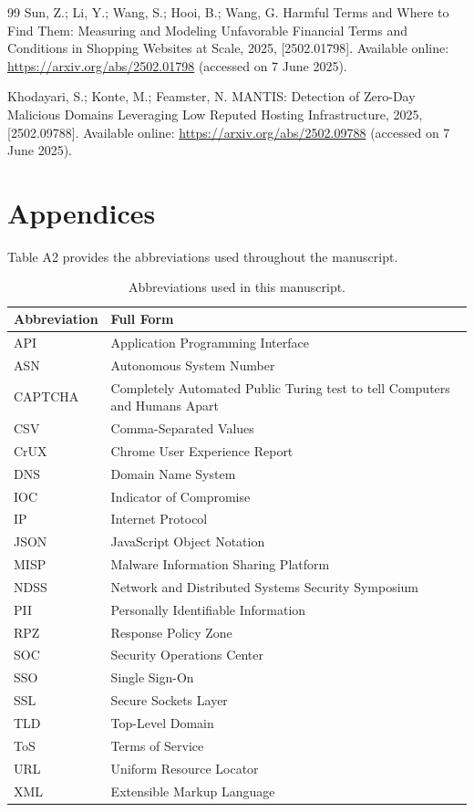 \documentclass[journal,article,submit,pdftex,moreauthors]{Definitions/mdpi}
\begin{document}
\begin{thebibliography}{99}
Sun, Z.; Li, Y.; Wang, S.; Hooi, B.; Wang, G. Harmful Terms and Where to Find Them: Measuring and Modeling Unfavorable Financial Terms and Conditions in Shopping Websites at Scale, 2025, [2502.01798]. Available online: \url{https://arxiv.org/abs/2502.01798} (accessed on 7 June 2025).

Khodayari, S.; Konte, M.; Feamster, N. MANTIS: Detection of Zero-Day Malicious Domains Leveraging Low Reputed Hosting Infrastructure, 2025, [2502.09788]. Available online: \url{https://arxiv.org/abs/2502.09788} (accessed on 7 June 2025).

\end{thebibliography}

\appendixstart
\appendix

\section[Appendix~\thesection]{Appendices}

Table A2 provides the abbreviations used throughout the manuscript.

\begin{table}[H]
\caption{Abbreviations used in this manuscript.\label{tab:A2}}
\begin{tabularx}{\textwidth}{lX}
\toprule
\textbf{Abbreviation} & \textbf{Full Form}\\
\midrule
API & Application Programming Interface\\
ASN & Autonomous System Number\\
CAPTCHA & Completely Automated Public Turing test to tell Computers and Humans Apart\\
CSV & Comma-Separated Values\\
CrUX & Chrome User Experience Report\\
DNS & Domain Name System\\
IOC & Indicator of Compromise\\
IP & Internet Protocol\\
JSON & JavaScript Object Notation\\
MISP & Malware Information Sharing Platform\\
NDSS & Network and Distributed Systems Security Symposium\\
PII & Personally Identifiable Information\\
RPZ & Response Policy Zone\\
SOC & Security Operations Center\\
SSO & Single Sign-On\\
SSL & Secure Sockets Layer\\
TLD & Top-Level Domain\\
ToS & Terms of Service\\
URL & Uniform Resource Locator\\
XML & Extensible Markup Language\\
\bottomrule
\end{tabularx}
\end{table}
\end{document}
